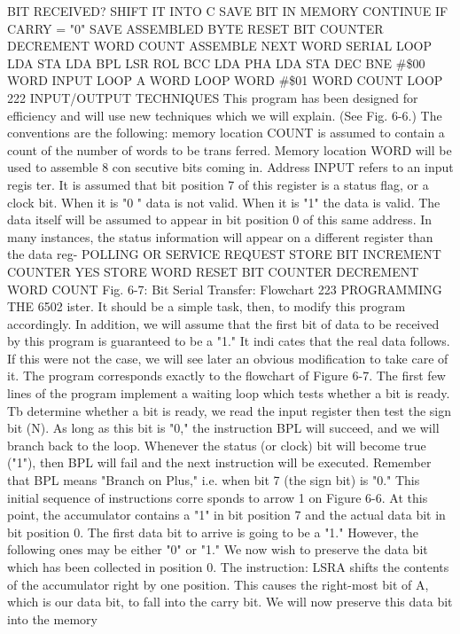 \documentclass{book}
\begin{document}
BIT RECEIVED?
SHIFT IT INTO C
SAVE BIT IN MEMORY
CONTINUE IF CARRY = "0"
SAVE ASSEMBLED BYTE
RESET BIT COUNTER
DECREMENT WORD COUNT
ASSEMBLE NEXT WORD
SERIAL
LOOP
LDA
STA
LDA
BPL
LSR
ROL
BCC
LDA
PHA
LDA
STA
DEC
BNE
#\$00
WORD
INPUT
LOOP
A
WORD
LOOP
WORD
#\$01
WORD
COUNT
LOOP
222
INPUT/OUTPUT TECHNIQUES
This program has been designed for efficiency and will use new
techniques which we will explain. (See Fig. 6-6.)
The conventions are the following: memory location COUNT is
assumed to contain a count of the number of words to be trans
ferred. Memory location WORD will be used to assemble 8 con
secutive bits coming in. Address INPUT refers to an input regis
ter. It is assumed that bit position 7 of this register is a status flag,
or a clock bit. When it is "0 " data is not valid. When it is "1" the
data is valid. The data itself will be assumed to appear in bit
position 0 of this same address. In many instances, the status
information will appear on a different register than the data reg-
POLLING OR SERVICE REQUEST
STORE BIT
INCREMENT COUNTER
YES
STORE WORD
RESET BIT COUNTER
DECREMENT WORD COUNT
Fig. 6-7: Bit Serial Transfer: Flowchart
223
PROGRAMMING THE 6502
ister. It should be a simple task, then, to modify this program
accordingly. In addition, we will assume that the first bit of data
to be received by this program is guaranteed to be a "1." It indi
cates that the real data follows. If this were not the case, we will
see later an obvious modification to take care of it. The program
corresponds exactly to the flowchart of Figure 6-7. The first few
lines of the program implement a waiting loop which tests
whether a bit is ready. Tb determine whether a bit is ready, we
read the input register then test the sign bit (N). As long as this
bit is "0," the instruction BPL will succeed, and we will branch
back to the loop. Whenever the status (or clock) bit will become
true ("1"), then BPL will fail and the next instruction will be
executed.
Remember that BPL means "Branch on Plus," i.e. when bit 7
(the sign bit) is "0." This initial sequence of instructions corre
sponds to arrow 1 on Figure 6-6.
At this point, the accumulator contains a "1" in bit position 7
and the actual data bit in bit position 0. The first data bit to arrive
is going to be a "1." However, the following ones may be either "0"
or "1." We now wish to preserve the data bit which has been
collected in position 0. The instruction:
LSRA
shifts the contents of the accumulator right by one position. This
causes the right-most bit of A, which is our data bit, to fall into
the carry bit. We will now preserve this data bit into the memory
\end{document}
